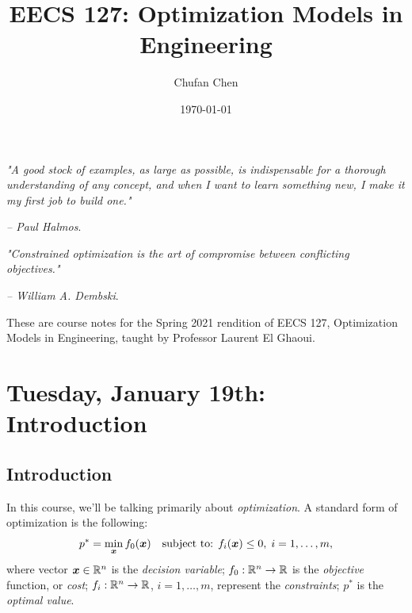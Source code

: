 \documentclass[11 pt]{scrartcl}
\begin{document}
 
\title{\Large EECS 127: Optimization Models in Engineering}
\author{\large Chufan Chen}
\date{\large\today}

\maketitle 

\begin{center}
\begin{displayquote}
    \emph{"A good stock of examples, as large as possible, is indispensable for a thorough understanding of any concept, and when I want to learn something new, I make it my first job to build one."} \\ \begin{flushright} \emph{– Paul Halmos}.  \end{flushright}
\end{displayquote}
\begin{displayquote}
    \emph{"Constrained optimization is the art of compromise between conflicting objectives."} \\ \begin{flushright} \emph{– William A. Dembski}.  \end{flushright}
\end{displayquote}
\end{center}


These are course notes for the Spring 2021 rendition of EECS 127, Optimization Models in Engineering, taught by Professor Laurent El Ghaoui.

\tableofcontents 

\newpage

\section{Tuesday, January 19th: Introduction}
\subsection{Introduction}
In this course, we'll be talking primarily about \emph{optimization}. 
A standard form of optimization is the following: 
\[ p^* = \min_{\bm{x}} f_0({\bm{x}})\quad \text{subject to: } f_i({\bm{x}}) \leq 0,\; i=1,\dots, m,\] 
where 
\itemnum
    \ii vector ${\bm{x}}\in \mathbb R^n$ is the \emph{decision variable}; 
    \ii $f_0: \mathbb R^n \to \mathbb R$ is the \emph{objective} function, or \emph{cost}; 
    \ii $f_i: \mathbb R^n\to \mathbb R$, $i=1,\dots, m$, represent the \emph{constraints}; 
    \ii $p^*$ is the \emph{optimal value}. 
\itemend
\end{document}
